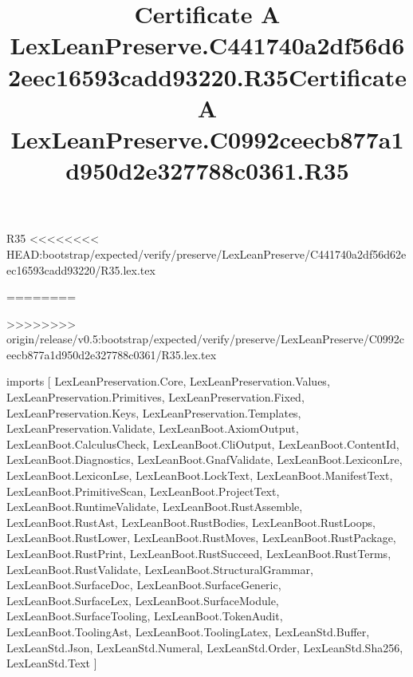 \begin{lexlean}{R35}
<<<<<<<< HEAD:bootstrap/expected/verify/preserve/LexLeanPreserve/C441740a2df56d62eec16593cadd93220/R35.lex.tex
\title{Certificate A LexLeanPreserve.C441740a2df56d62eec16593cadd93220.R35}
========
\title{Certificate A LexLeanPreserve.C0992ceecb877a1d950d2e327788c0361.R35}
>>>>>>>> origin/release/v0.5:bootstrap/expected/verify/preserve/LexLeanPreserve/C0992ceecb877a1d950d2e327788c0361/R35.lex.tex
\begin{coremodule}
imports [
  LexLeanPreservation.Core,
  LexLeanPreservation.Values,
  LexLeanPreservation.Primitives,
  LexLeanPreservation.Fixed,
  LexLeanPreservation.Keys,
  LexLeanPreservation.Templates,
  LexLeanPreservation.Validate,
  LexLeanBoot.AxiomOutput,
  LexLeanBoot.CalculusCheck,
  LexLeanBoot.CliOutput,
  LexLeanBoot.ContentId,
  LexLeanBoot.Diagnostics,
  LexLeanBoot.GnafValidate,
  LexLeanBoot.LexiconLre,
  LexLeanBoot.LexiconLse,
  LexLeanBoot.LockText,
  LexLeanBoot.ManifestText,
  LexLeanBoot.PrimitiveScan,
  LexLeanBoot.ProjectText,
  LexLeanBoot.RuntimeValidate,
  LexLeanBoot.RustAssemble,
  LexLeanBoot.RustAst,
  LexLeanBoot.RustBodies,
  LexLeanBoot.RustLoops,
  LexLeanBoot.RustLower,
  LexLeanBoot.RustMoves,
  LexLeanBoot.RustPackage,
  LexLeanBoot.RustPrint,
  LexLeanBoot.RustSucceed,
  LexLeanBoot.RustTerms,
  LexLeanBoot.RustValidate,
  LexLeanBoot.StructuralGrammar,
  LexLeanBoot.SurfaceDoc,
  LexLeanBoot.SurfaceGeneric,
  LexLeanBoot.SurfaceLex,
  LexLeanBoot.SurfaceModule,
  LexLeanBoot.SurfaceTooling,
  LexLeanBoot.TokenAudit,
  LexLeanBoot.ToolingAst,
  LexLeanBoot.ToolingLatex,
  LexLeanStd.Buffer,
  LexLeanStd.Json,
  LexLeanStd.Numeral,
  LexLeanStd.Order,
  LexLeanStd.Sha256,
  LexLeanStd.Text
]


\end{coremodule}
\end{lexlean}
